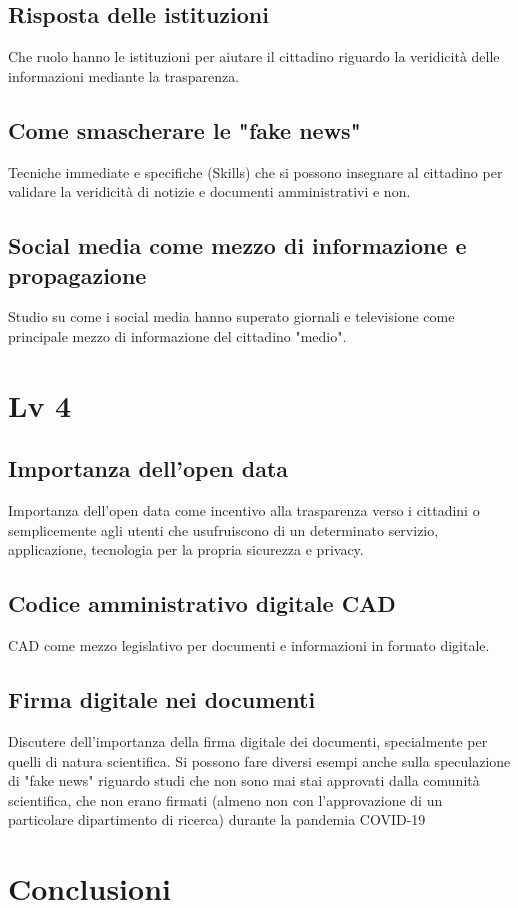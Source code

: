 \documentclass{article}
\begin{document}
\subsection{Risposta delle istituzioni}
Che ruolo hanno le istituzioni per aiutare il cittadino riguardo la veridicità delle informazioni mediante la trasparenza.
\subsection{Come smascherare le "fake news"}
Tecniche immediate e specifiche (Skills) che si possono insegnare al cittadino per validare la veridicità di notizie e documenti amministrativi e non.
\subsection{Social media come mezzo di informazione e propagazione}
Studio su come i social media hanno superato giornali e televisione come principale mezzo di informazione del cittadino "medio".
\section{Lv 4}
\subsection{Importanza dell'open data}
Importanza dell'open data come incentivo alla trasparenza verso i cittadini o semplicemente agli utenti che usufruiscono di un determinato servizio, applicazione, tecnologia per la propria sicurezza e privacy. 
\subsection{Codice amministrativo digitale CAD}
CAD come mezzo legislativo per documenti e informazioni in formato digitale.
\subsection{Firma digitale nei documenti}
Discutere dell'importanza della firma digitale dei documenti, specialmente per quelli di natura scientifica.
Si possono fare diversi esempi anche sulla speculazione di "fake news" riguardo studi che non sono mai stai approvati dalla comunità scientifica, che non erano firmati (almeno non con l'approvazione di un particolare dipartimento di ricerca) durante la pandemia COVID-19
\section{Conclusioni}
\printindex
\end{document}
